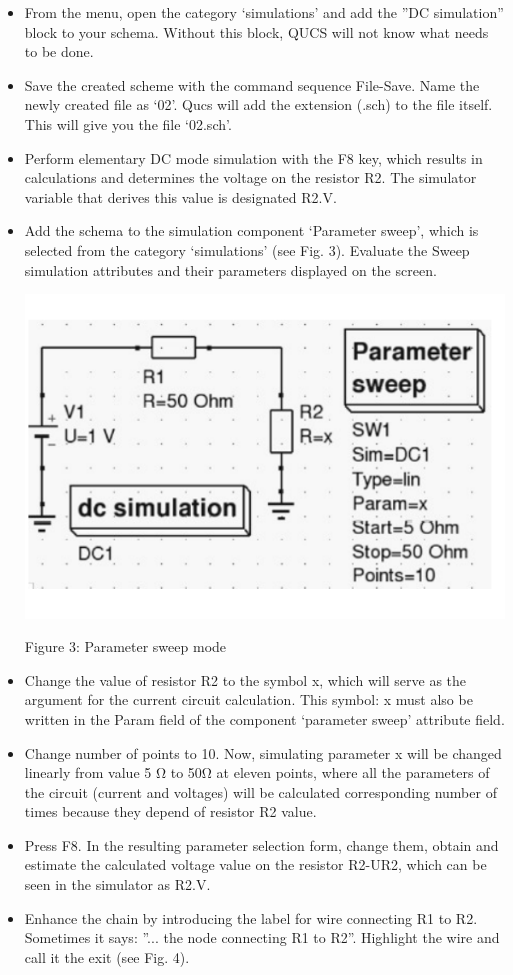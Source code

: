 \documentclass{report}
\begin{document}
\begin{itemize}
\item From the menu, open the category ‘simulations’ and add the ”DC simulation” block to
your schema. Without this block, QUCS will not know what needs to be done.
\item Save the created scheme with the command sequence File-Save. Name the newly created
file as ‘02’. Qucs will add the extension (.sch) to the file itself. This will give you the
file ‘02.sch’.
\item Perform elementary DC mode simulation with the F8 key, which results in calculations
and determines the voltage on the resistor R2. The simulator variable that derives this
value is designated R2.V.
\item Add the schema to the simulation component ‘Parameter sweep’, which is selected from
the category ‘simulations’ (see Fig. 3). Evaluate the Sweep simulation attributes and
their parameters displayed on the screen.

\includegraphics{Figu}
\begin{center}
Figure 3: Parameter sweep mode
\end{center}

\item Change the value of resistor R2 to the symbol x, which will serve as the argument for the
current circuit calculation. This symbol: x must also be written in the Param field of the
component ‘parameter sweep’ attribute field.
\item Change number of points to 10. Now, simulating parameter x will be changed linearly
from value 5 Ω to 50Ω at eleven points, where all the parameters of the circuit (current
and voltages) will be calculated corresponding number of times because they depend of
resistor R2 value.
\item Press F8. In the resulting parameter selection form, change them, obtain and estimate
the calculated voltage value on the resistor R2-UR2, which can be seen in the simulator
as R2.V.
\item Enhance the chain by introducing the label for wire connecting R1 to R2. Sometimes it
says: ”... the node connecting R1 to R2”. Highlight the wire and call it the exit (see Fig.
4).

 \end{itemize}
 
\end{document}
